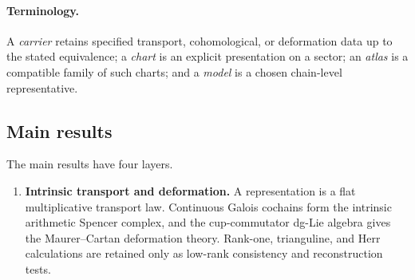 \documentclass[11pt]{article}
\theoremstyle{definition}
\begin{document}
\paragraph{Terminology.}
A \emph{carrier} retains specified transport, cohomological, or deformation data up to the stated equivalence; a \emph{chart} is an explicit presentation on a sector; an \emph{atlas} is a compatible family of such charts; and a \emph{model} is a chosen chain-level representative.

\subsection{Main results}

The main results have four layers.

\begin{enumerate}[label=\textbf{(\arabic*)}]
\item \textbf{Intrinsic transport and deformation.}
A representation is a flat multiplicative transport law.  Continuous Galois cochains form the intrinsic arithmetic Spencer complex, and the cup-commutator dg-Lie algebra gives the Maurer--Cartan deformation theory.  Rank-one, trianguline, and Herr calculations are retained only as low-rank consistency and reconstruction tests.


\end{enumerate}
\end{document}
